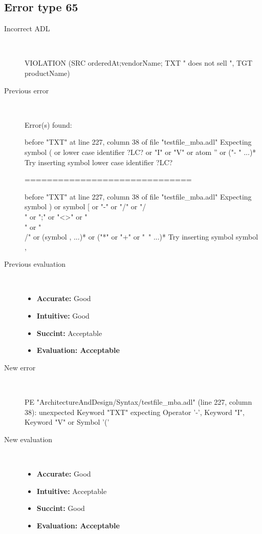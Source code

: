 \hrulefill

\subsection{Error type 65}
  \begin{description}
  \item[Incorrect ADL]~\\
\begin{adl}
VIOLATION (SRC orderedAt;vendorName; TXT " does not sell ", TGT productName)\end{adl}
  \item[Previous error]~\\
\begin{haskell}
Error(s) found:

before "TXT" at line 227, column 38 of file "testfile_mba.adl"
Expecting symbol ( or lower case identifier ?LC? or "I" or "V" or atom '' or ("-
" ...)*
Try inserting symbol lower case identifier ?LC?

==============================

before "TXT" at line 227, column 38 of file "testfile_mba.adl"
Expecting symbol ) or symbol [ or "-" or "/" or "/\\" or ";" or "<>" or "\\" or
"\\/" or (symbol , ...)* or ("*" or "+" or "~" ...)*
Try inserting symbol symbol ,
\end{haskell}
  \item[Previous evaluation]~\\
    \begin{itemize}
    \item \textbf{Accurate:} Good
    \item \textbf{Intuitive:} Good
    \item \textbf{Succint:} Acceptable
    \item \textbf{Evaluation: Acceptable}
    \end{itemize}
  \item[New error]~\\
\begin{haskell}
PE "ArchitectureAndDesign/Syntax/testfile_mba.adl" (line 227, column 38):
unexpected Keyword "TXT"
expecting Operator '-', Keyword "I", Keyword "V" or Symbol '('\end{haskell}
  \item[New evaluation]~\\
    \begin{itemize}
    \item \textbf{Accurate:} Good
    \item \textbf{Intuitive:} Acceptable
    \item \textbf{Succint:} Good
    \item \textbf{Evaluation: Acceptable
}
    \end{itemize}
  \end{description}

